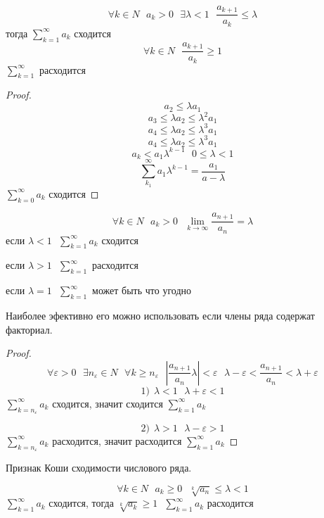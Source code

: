 \begin{theorem}
  $$
  \forall k \in N ~~~ a_k > 0 ~~~ \exists \lambda < 1 ~~~
  \frac{a_{k+1}}{a_k} \le \lambda
  $$
  тогда $\sum_{k=1}^{\infty} a_k$ сходится
  $$
  \forall k \in N ~~~ \frac{a_{k+1}}{a_k} \ge 1
  $$
  $\sum_{k=1}^{\infty}$ расходится
\end{theorem}

\begin{proof}
  $$
  a_2 \le \lambda a_1
  $$
  $$
  a_3 \le \lambda a_2 \le \lambda^2 a_1
  $$
  $$
  a_4 \le \lambda a_2 \le \lambda^3 a_1
  $$
  $$
  a_4 \le \lambda a_2 \le \lambda^3 a_1
  $$
  $$
  a_k < a_1 \lambda^{k-1} ~~~ 0 \le \lambda < 1
  $$
  $$
  \sum_{k_1}^{\infty} a_1 \lambda^{k-1} = \frac{a_1}{a-\lambda}
  $$
  $\sum_{k=0}^{\infty} a_k$ сходится
\end{proof}

\begin{theorem}
  $$
  \forall k \in N ~~~ a_k > 0 ~~~
  \lim_{k \to \infty} \frac{a_{n+1}}{a_n} = \lambda
  $$
  если $\lambda < 1 ~~~ \sum_{k=1}^{\infty} a_k$ сходится

  если $\lambda > 1 ~~~ \sum_{k=1}^{\infty}$ расходится

  если $\lambda = 1 ~~~ \sum_{k=1}^{\infty}$ может быть что угодно

  Наиболее эфективно его можно использовать если члены ряда содержат факториал.
\end{theorem}

\begin{proof}
  $$
  \forall \varepsilon > 0 ~~~
  \exists n_{\varepsilon} \in N ~~~
  \forall k \ge n_{\varepsilon} ~~~
  \left| \frac{a_{n+1}}{a_n} \lambda \right| < \varepsilon ~~~
  \lambda - \varepsilon < \frac{a_{n+1}}{a_n} < \lambda + \varepsilon
  $$
  $$
  1) ~~ \lambda < 1 ~~~ \lambda + \varepsilon < 1
  $$
  $\sum_{k = n_{\varepsilon}}^{\infty} a_k$ сходится, значит сходится
$\sum_{k = 1}^{\infty} a_k$

  $$
  2) ~~ \lambda > 1 ~~~ \lambda - \varepsilon > 1
  $$
  $\sum_{k = n_{\varepsilon}}^{\infty} a_k$ расходится, значит расходится
$\sum_{k = 1}^{\infty} a_k$
\end{proof}

\begin{title}[\Large]
  Признак Коши сходимости числового ряда.
\end{title}

\begin{theorem}
  $$
  \forall k \in N ~~~ a_k \ge 0 ~~~ \sqrt[k]{a_n} \le \lambda < 1
  $$
  $\sum_{k=1}^{\infty} a_k$ сходится, тогда
  $\sqrt[k]{a_k} \ge 1 ~~~ \sum_{k=1}^{\infty} a_k$ расходится
\end{theorem}

